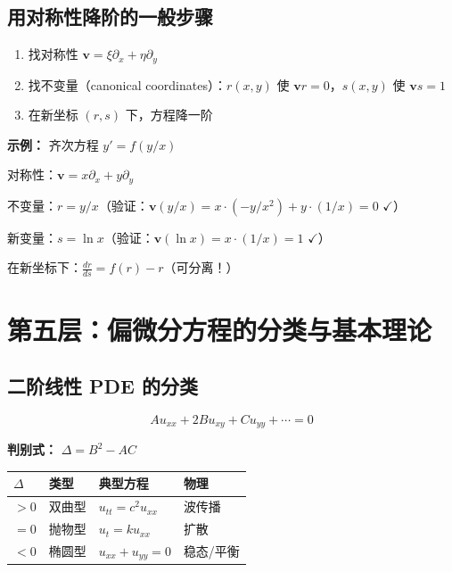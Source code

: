 \subsection{用对称性降阶的一般步骤}

\begin{enumerate}
  \item 找对称性 $\mathbf{v} = \xi\partial_x + \eta\partial_y$
  \item 找不变量（canonical coordinates）：$r(x,y)$ 使 $\mathbf{v}r = 0$，$s(x,y)$ 使 $\mathbf{v}s = 1$
  \item 在新坐标 $(r, s)$ 下，方程降一阶
\end{enumerate}

\textbf{示例：} 齐次方程 $y' = f(y/x)$

对称性：$\mathbf{v} = x\partial_x + y\partial_y$

不变量：$r = y/x$（验证：$\mathbf{v}(y/x) = x \cdot (-y/x^2) + y \cdot (1/x) = 0$ $\checkmark$）

新变量：$s = \ln x$（验证：$\mathbf{v}(\ln x) = x \cdot (1/x) = 1$ $\checkmark$）

在新坐标下：$\frac{dr}{ds} = f(r) - r$（可分离！）

\section{第五层：偏微分方程的分类与基本理论}

\subsection{二阶线性 PDE 的分类}

\[
Au_{xx} + 2Bu_{xy} + Cu_{yy} + \cdots = 0
\]

\textbf{判别式：} $\Delta = B^2 - AC$

\begin{center}
\begin{tabular}{p{2cm}p{2.5cm}p{4cm}p{3cm}}
\toprule
\textbf{$\Delta$} & \textbf{类型} & \textbf{典型方程} & \textbf{物理} \\
\midrule
$> 0$ & 双曲型 & $u_{tt} = c^2 u_{xx}$ & 波传播 \\
$= 0$ & 抛物型 & $u_t = ku_{xx}$ & 扩散 \\
$< 0$ & 椭圆型 & $u_{xx} + u_{yy} = 0$ & 稳态/平衡 \\
\bottomrule
\end{tabular}
\end{center}

